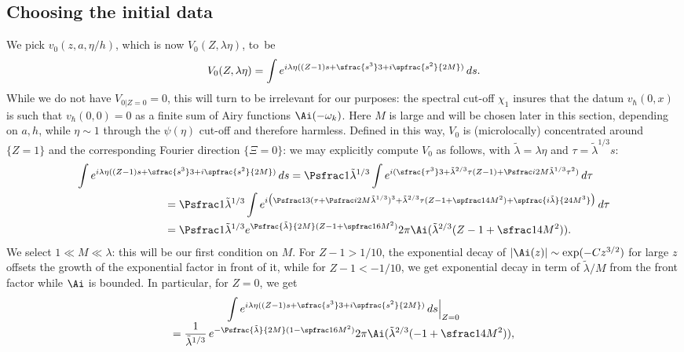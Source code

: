 \subsection{Choosing the initial data}
\label{sec:donnee}
We pick $v_0(z,a,\eta/h)$, which is now $V_0({Z},\lambda \eta)$, to~be
\begin{equation}
\label{eq:53}
V_{0}({Z},\lambda \eta)=\int e^{i\lambda \eta(({Z}-1) s+\sfrac {s^{3}} 3 + i \spfrac {s^{2}}{2M})} \,ds.
\end{equation}
While we do not have $V_{0|{{Z}=0}}=0$, this will turn to be irrelevant for our purposes: the spectral cut-off $\chi_{1}$ insures that the datum $v_{\hbar}(0,x)$ is such that $v_{\hbar}(0,0)=0$ as a finite sum of Airy functions $\Ai(-\omega_{k})$. Here $M$ is large and will be chosen later in this section, depending on $a,h$, while $\eta\sim 1$ through the $\psi(\eta)$ cut-off and therefore harmless. Defined in this way, $V_{0}$ is (microlocally) concentrated around $\{{Z}=1\}$ and the corresponding Fourier direction $\{ \Xi=0\}$: we may explicitly compute $V_0$ as follows, with $\tilde \lambda=\lambda \eta$ and $\tau=\tilde\lambda^{1/3}s$:
\begin{align*}
\int e^{i\lambda \eta(({Z}-1) s+\sfrac {s^{3}} 3 +i \spfrac {s^{2}}{2M})} \,ds& = \Psfrac 1 {\tilde \lambda^{1/3}} \int e^{i(\sfrac {\tau^{3}} 3+ \tilde \lambda^{2/3}\tau({Z} -1)+ \Psfrac i {2M} \tilde \lambda^{1/3} \tau^{2}) }\,d\tau\\
&\hspace*{-4cm} = \Psfrac 1 {\tilde \lambda^{1/3}} \int e^{i\bigl(\Psfrac 13 (\tau+ \Psfrac i {2M} \tilde \lambda^{1/3})^{ 3}+ \tilde \lambda^{2/3}\tau({Z} -1+\spfrac 1 {4M^{2}}) +\spfrac{i\tilde \lambda}{24M^{3}}\bigr)} \,d\tau\\
&\hspace*{-4cm} = \Psfrac 1 {\tilde \lambda^{1/3}} e^{ \Psfrac{\tilde \lambda}{2M} ({Z}-1+\spfrac1 {6M^{2}})} 2\pi \Ai(\tilde \lambda^{2/3}({Z}-1+\sfrac 1 {4M^{2}})).
\end{align*}
We select $1 \ll M\ll \lambda$: this will be our first condition on $M$. For $Z-1>1/10$, the exponential decay of $|\Ai(z)|\sim \exp(-C z^{3/2})$ for large $z$ offsets the growth of the exponential factor in front of it, while for $Z-1<-1/10$, we get exponential decay in term of $\tilde \lambda /M$ from the front factor while $\Ai$ is bounded. In particular, for ${Z}=0$, we get
\begin{multline*}
\label{eq:54}
\int e^{i\lambda \eta(({Z}-1) s+\sfrac {s^{3}} 3 +i \spfrac {s^{2}}{2M})} \,ds\Big|_{{Z}=0}\\[
-3pt]
=\frac 1 {\tilde \lambda^{1/3}}\, e^{ -\Psfrac{\tilde \lambda}{2M} (1-\spfrac1 {6M^{2}})} 2\pi \Ai(\tilde \lambda^{2/3}(-1+\sfrac 1 {4M^{2}})),
\end{multline*}
